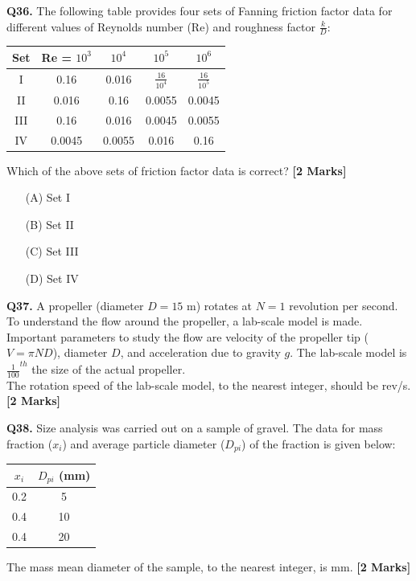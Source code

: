 \documentclass[11pt]{article}
\newcommand{\questionb}[2]{
    \noindent\textbf{Q#2.} #1 \hfill \textbf{[2 Marks]}
}
\begin{document}
\questionb{The following table provides four sets of Fanning friction factor data for different values of Reynolds number (Re) and roughness factor \( \frac{k}{D} \):  
\begin{center}
\begin{tabular}{|c|c|c|c|c|}
\hline
Set & Re = \(10^3\) & \(10^4\) & \(10^5\) & \(10^6\) \\
\hline
I & 0.16 & 0.016 & \( \frac{16}{10^4} \) & \( \frac{16}{10^5} \) \\
II & 0.016 & 0.16 & 0.0055 & 0.0045 \\
III & 0.16 & 0.016 & 0.0045 & 0.0055 \\
IV & 0.0045 & 0.0055 & 0.016 & 0.16 \\
\hline
\end{tabular}
\end{center}
Which of the above sets of friction factor data is correct?}{36}
\begin{enumerate}
    \item[(A)] Set I  
    \item[(B)] Set II  
    \item[(C)] Set III  
    \item[(D)] Set IV  
\end{enumerate}
\vspace{0.5cm}

\questionb{A propeller (diameter \( D = 15 \) m) rotates at \( N = 1 \) revolution per second. To understand the flow around the propeller, a lab-scale model is made. Important parameters to study the flow are velocity of the propeller tip (\( V = \pi ND \)), diameter \( D \), and acceleration due to gravity \( g \). The lab-scale model is \( \frac{1}{100}^{th} \) the size of the actual propeller. \\  
The rotation speed of the lab-scale model, to the nearest integer, should be rev/s.}{37}
\vspace{0.5cm}

\questionb{Size analysis was carried out on a sample of gravel. The data for mass fraction (\( x_i \)) and average particle diameter (\( D_{pi} \)) of the fraction is given below:

\begin{center}
\begin{tabular}{|c|c|}
\hline
\( x_i \) & \( D_{pi} \) (mm) \\
\hline
0.2 & 5 \\
0.4 & 10 \\
0.4 & 20 \\
\hline
\end{tabular}
\end{center}
The mass mean diameter of the sample, to the nearest integer, is mm.}{38}
\vspace{0.5cm}
\end{document}
